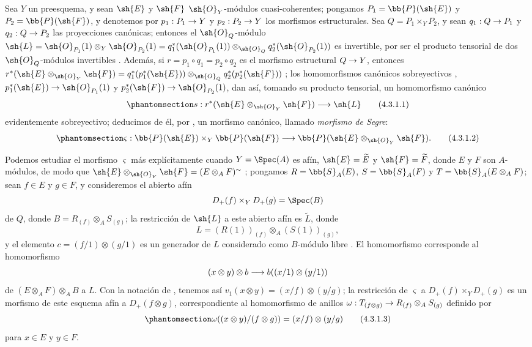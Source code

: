 \documentclass[oneside,10pt]{amsart}
\makeatletter
\newcommand{\ega@arrow}[2]{\mathchoice{#1}{#2}{#2}{#2}}
\renewcommand{\to}{\ega@arrow{\longrightarrow}{\rightarrow}}
\newcommand{\oldpage}[2][]{\marginnote{\normalfont\footnotesize\textbf{#1}~|~#2}\ignorespaces}
\let\EGAOriginalLabel\label
\renewcommand{\label}[1]{\phantomsection\EGAOriginalLabel{#1}}
\makeatother
\begin{document}
\begin{env}[4.3.1]
\label{II.4.3.1}
Sea $Y$ un preesquema, y sean $\sh{E}$ y $\sh{F}$ $\sh{O}_Y$-módulos cuasi-coherentes;
pongamos $P_1=\bb{P}(\sh{E})$ y $P_2=\bb{P}(\sh{F})$, y denotemos por $p_1:P_1\to Y$ y $p_2:P_2\to Y$ los morfismos estructurales.
Sea $Q=P_1\times_Y P_2$, y sean $q_1:Q\to P_1$ y $q_2:Q\to P_2$ las proyecciones canónicas;
entonces el $\sh{O}_Q$-módulo
$\sh{L}=\sh{O}_{P_1}(1)\otimes_Y\sh{O}_{P_2}(1)=q_1^*(\sh{O}_{P_1}(1))\otimes_{\sh{O}_Q}q_2^*(\sh{O}_{P_2}(1))$ es invertible, por ser el producto tensorial de dos $\sh{O}_Q$-módulos invertibles .
Además, si $r=p_1\circ q_1=p_2\circ q_2$ es el morfismo estructural $Q\to Y$, entonces
$r^*(\sh{E}\otimes_{\sh{O}_Y}\sh{F})=q_1^*(p_1^*(\sh{E}))\otimes_{\sh{O}_Q}q_2^*(p_2^*(\sh{F}))$ ;
los homomorfismos canónicos sobreyectivos , $p_1^*(\sh{E})\to\sh{O}_{P_1}(1)$ y $p_2^*(\sh{F})\to\sh{O}_{P_2}(1)$, dan así, tomando su producto tensorial, un homomorfismo canónico
\[
\label{II.4.3.1.1}
  s:r^*(\sh{E}\otimes_{\sh{O}_Y}\sh{F})\to\sh{L}
  \tag{4.3.1.1}
\]
evidentemente sobreyectivo;
deducimos de él, por , un morfismo canónico, llamado \emph{morfismo de Segre}:
\[
\label{II.4.3.1.2}
  \varsigma:\bb{P}(\sh{E})\times_Y\bb{P}(\sh{F})\to\bb{P}(\sh{E}\otimes_{\sh{O}_Y}\sh{F}).
  \tag{4.3.1.2}
\]

Podemos estudiar el morfismo $\varsigma$ más explícitamente cuando $Y=\Spec(A)$ es afín, $\sh{E}=\widetilde{E}$ y $\sh{F}=\widetilde{F}$, donde $E$ y $F$ son $A$-módulos, de modo que $\sh{E}\otimes_{\sh{O}_Y}\sh{F}=(E\otimes_A F)^\sim$ ;
pongamos $R=\bb{S}_A(E)$, $S=\bb{S}_A(F)$ y $T=\bb{S}_A(E\otimes_A F)$;
sean $f\in E$ y $g\in F$, y consideremos el abierto afín
\[
  D_+(f)\times_Y D_+(g)=\Spec(B)
\]
\oldpage[II]{77}
de $Q$, donde $B=R_{(f)}\otimes_A S_{(g)}$;
la restricción de $\sh{L}$ a este abierto afín es $\widetilde{L}$, donde
\[
  L=(R(1))_{(f)}\otimes_A(S(1))_{(g)},
\]
y el elemento $c=(f/1)\otimes(g/1)$ es un generador de $L$ considerado como $B$-módulo libre .
El homomorfismo  corresponde al homomorfismo
\[
  (x\otimes y)\otimes b\to b((x/1)\otimes(y/1))
\]
de $(E\otimes_A F)\otimes_A B$ a $L$.
Con la notación de , tenemos así $v_1(x\otimes y)=(x/f)\otimes(y/g)$;
la restricción de $\varsigma$ a $D_+(f)\times_YD_+(g)$ es un morfismo de este esquema afín a $D_+(f\otimes g)$, correspondiente al homomorfismo de anillos $\omega:T_{(f\otimes g)}\to R_{(f)}\otimes_A S_{(g)}$ definido por
\[
\label{II.4.3.1.3}
  \omega((x\otimes y)/(f\otimes g))=(x/f)\otimes(y/g)
  \tag{4.3.1.3}
\]
para $x\in E$ y $y\in F$.
\end{env}
\end{document}
